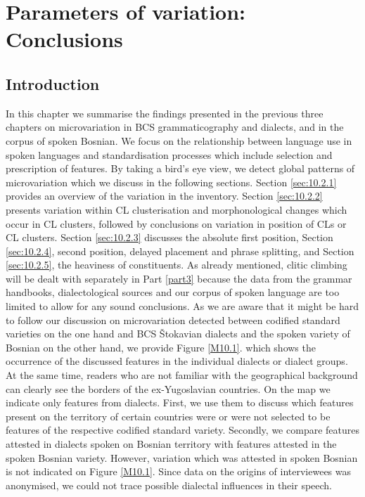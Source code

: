 \chapter{Parameters of variation: {C}onclusions}
\label{Parameters of variation: conclusions}
\section{Introduction}
In this chapter we summarise the findings presented in the previous three chapters on microvariation in BCS grammaticography and dialects, and in the corpus of spoken Bosnian. We focus on the relationship between language use in spoken languages and standardisation processes which include selection and prescription of features. By taking a bird's eye view, we detect global patterns of microvariation which we discuss in the following sections. Section \ref{sec:10.2.1} provides an overview of the variation in the inventory. Section \ref{sec:10.2.2} presents variation within CL clusterisation and morphonological changes which occur in CL clusters, followed by conclusions on variation in position of CLs or CL clusters. Section \ref{sec:10.2.3} discusses the absolute first position, Section \ref{sec:10.2.4}, second position, delayed placement and phrase splitting, and Section \ref{sec:10.2.5}, the heaviness of constituents. As already mentioned, clitic climbing will be dealt with separately in Part \ref{part3} because the data from the grammar handbooks, dialectological sources and our corpus of spoken language are too limited to allow for any sound conclusions. As we are aware that it might be hard to follow our discussion on microvariation detected between codified standard varieties on the one hand and BCS Štokavian dialects and the spoken variety of Bosnian on the other hand, we provide Figure \ref{M10.1}. which shows the occurrence of the discussed features in the individual dialects or dialect groups. At the same time, readers who are not familiar with the geographical background can clearly see the borders of the ex-Yugoslavian countries. On the map we indicate only features from dialects. First, we use them to discuss which features present on the territory of certain countries were or were not selected to be features of the respective codified standard variety. Secondly, we compare features attested in dialects spoken on Bosnian territory with features attested in the spoken Bosnian variety. However, variation which was attested in spoken Bosnian is not indicated on Figure \ref{M10.1}. Since data on the origins of interviewees was anonymised, we could not trace possible dialectal influences in their speech. 

